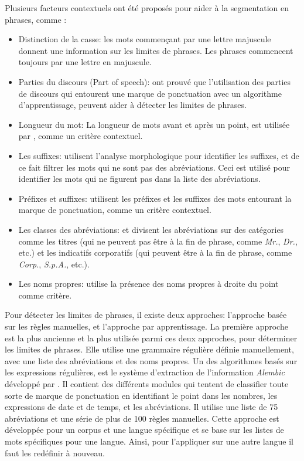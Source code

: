 \documentclass[a4paper,12pt,oneside]{../use/ESIthesis}
\begin{document}
Plusieurs facteurs contextuels ont été proposés pour aider à la segmentation en phrases, comme \cite{10-palmer}:
\begin{itemize}
\item Distinction de la casse: les mots commençant par une lettre majuscule donnent une information sur les limites de phrases. 
Les phrases commencent toujours par une lettre en majuscule.

\item Parties du discours (Part of speech): \cite{97-palmer-hearst} ont prouvé que l'utilisation des parties de discours qui entourent une marque de ponctuation avec un algorithme d'apprentissage, peuvent aider à détecter les limites de phrases. 

\item Longueur du mot: La longueur de mots avant et après un point, est utilisée par \cite{89-riley}, comme un critère contextuel. 

\item Les suffixes: \cite{80-muller-al} utilisent l'analyse morphologique pour identifier les suffixes, et de ce fait filtrer les mots qui ne sont pas des abréviations. 
Ceci est utilisé pour identifier les mots qui ne figurent pas dans la liste des abréviations. 

\item Préfixes et suffixes: \cite{97-reynar-ratnaparkhi} utilisent les préfixes et les suffixes des mots entourant la marque de ponctuation, comme un critère contextuel. 
\item Les classes des abréviations: \cite{89-riley} et \cite{97-reynar-ratnaparkhi} divisent les abréviations sur des catégories comme les titres (qui ne peuvent pas être à la fin de phrase, comme \textit{Mr.}, \textit{Dr.}, etc.) et les indicatifs corporatifs (qui peuvent être à la fin de phrase, comme \textit{Corp.}, \textit{S.p.A.}, etc.). 

\item Les noms propres: \cite{02-mikheev} utilise la présence des noms propres à droite du point comme critère. 
\end{itemize}

Pour détecter les limites de phrases, il existe deux approches: l'approche basée sur les règles manuelles, et l'approche par apprentissage. 
La première approche est la plus ancienne et la plus utilisée \cite{10-palmer} parmi ces deux approches, pour déterminer les limites de phrases. 
Elle utilise une grammaire régulière définie manuellement, avec une liste des abréviations et des noms propres. 
Un des algorithmes basés sur les expressions régulières, est le système d'extraction de l'information \textit{Alembic} développé par \cite{95-aberdeen-al}. 
Il contient des différents modules qui tentent de classifier toute sorte de marque de ponctuation en identifiant le point dans les nombres, les expressions de date et de temps, et les abréviations. 
Il utilise une liste de 75 abréviations et une série de plus de 100 règles manuelles. 
Cette approche est développée pour un corpus et une langue spécifique et se base sur les listes de mots spécifiques pour une langue.
Ainsi, pour l'appliquer sur une autre langue il faut les redéfinir à nouveau. 
\end{document}
